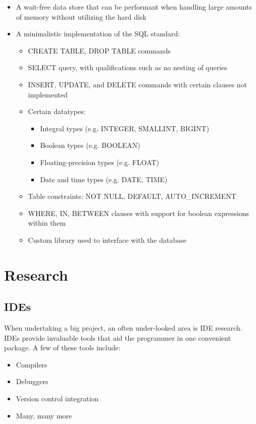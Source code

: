 \documentclass[letterpaper, 11pt]{article}
\begin{document}
\begin{itemize}
 \item A wait-free data store that can be performant when handling large amounts
 of memory without utilizing the hard disk
 \item A minimalistic implementation of the SQL standard:
 \begin{itemize}
  \item CREATE TABLE, DROP TABLE commands
  \item SELECT query, with qualifications such as no nesting of queries 
  \item INSERT, UPDATE, and DELETE commands with certain clauses not implemented
  \item Certain datatypes:
    \begin{itemize}
      \item Integral types (e.g. INTEGER, SMALLINT, BIGINT)
      \item Boolean types (e.g. BOOLEAN)
      \item Floating-precision types (e.g. FLOAT)
      \item Date and time types (e.g. DATE, TIME)
    \end{itemize}
  \item Table constraints: NOT NULL, DEFAULT, AUTO\_INCREMENT
  \item WHERE, IN, BETWEEN clauses with support for boolean expressions within them
  \item Custom library used to interface with the database
 \end{itemize}
\end{itemize}

\newpage

\section{Research}

\subsection{IDEs}
When undertaking a big project, an often under-looked area is IDE research. IDEs provide
invaluable tools that aid the programmer in one convenient package. A few of these tools include:

\begin{itemize}
	\item Compilers
	\item Debuggers
	\item Version control integration
	\item Many, many more
\end{itemize}
\end{document}
